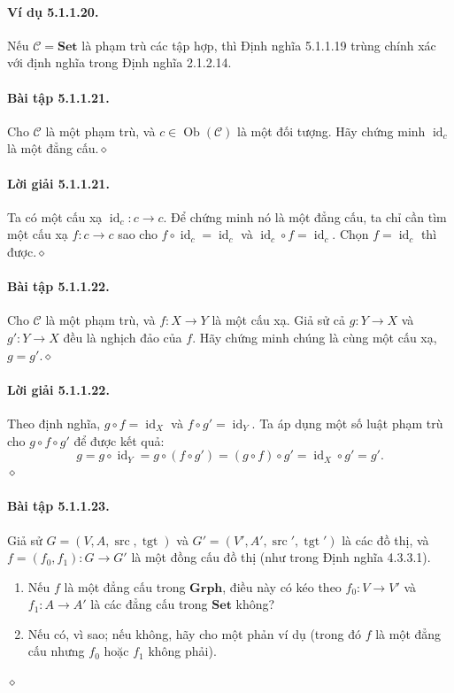 \paragraph{Ví dụ 5.1.1.20.} Nếu $\mathcal C=\mathbf{Set}$ là phạm trù các tập hợp, thì Định nghĩa 5.1.1.19 trùng chính xác với định nghĩa trong Định nghĩa 2.1.2.14.
\paragraph{Bài tập 5.1.1.21.} Cho $\mathcal C$ là một phạm trù, và $c\in\operatorname{Ob}(\mathcal C)$ là một đối tượng. Hãy chứng minh $\operatorname{id}_c$ là một đẳng cấu.\hfill$\diamond$
\paragraph{Lời giải 5.1.1.21.} Ta có một cấu xạ $\operatorname{id}_c:c\to c$. Để chứng minh nó là một đẳng cấu, ta chỉ cần tìm một cấu xạ $f:c\to c$ sao cho $f\circ\operatorname{id}_c=\operatorname{id}_c$ và $\operatorname{id}_c\circ f=\operatorname{id}_c$. Chọn $f=\operatorname{id}_c$ thì được.\hfill$\diamond$
\paragraph{Bài tập 5.1.1.22.} Cho $\mathcal C$ là một phạm trù, và $f:X\to Y$ là một cấu xạ. Giả sử cả $g:Y\to X$ và $g':Y\to X$ đều là nghịch đảo của $f$. Hãy chứng minh chúng là cùng một cấu xạ, $g=g'$.\hfill$\diamond$
\paragraph{Lời giải 5.1.1.22.} Theo định nghĩa, $g\circ f=\operatorname{id}_X$ và $f\circ g'=\operatorname{id}_Y$. Ta áp dụng một số luật phạm trù cho $g\circ f\circ g'$ để được kết quả:
\[g=g\circ\operatorname{id}_Y=g\circ(f\circ g')=(g\circ f)\circ g'=\operatorname{id}_X\circ g'=g'.\]\hfill$\diamond$
\paragraph{Bài tập 5.1.1.23.} Giả sử $G=(V,A,\operatorname{src},\operatorname{tgt})$ và $G'=(V',A',\operatorname{src}',\operatorname{tgt}')$ là các đồ thị, và $f=(f_0,f_1):G\to G'$ là một đồng cấu đồ thị (như trong Định nghĩa 4.3.3.1).
\begin{enumerate}[label=\alph*.]
\item Nếu $f$ là một đẳng cấu trong $\mathbf{Grph}$, điều này có kéo theo $f_0:V\to V'$ và $f_1:A\to A'$ là các đẳng cấu trong $\mathbf{Set}$ không?
\item Nếu có, vì sao; nếu không, hãy cho một phản ví dụ (trong đó $f$ là một đẳng cấu nhưng $f_0$ hoặc $f_1$ không phải).
\end{enumerate}\hfill$\diamond$
